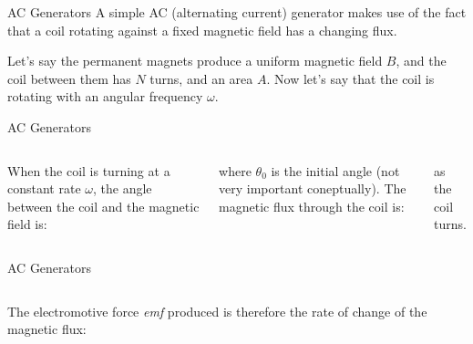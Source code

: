 \documentclass[12pt,aspectratio=169]{beamer}
\begin{document}
\begin{frame}{AC Generators}
  A simple AC (alternating current) generator makes use of the fact that a 
  coil rotating against a fixed magnetic field has a changing flux.
  \begin{center}
  \end{center}
  Let's say the permanent magnets produce a uniform magnetic field $B$, and the
  coil between them has $N$ turns, and an area $A$. Now let's say that the coil
  is rotating with an angular frequency $\omega$.
\end{frame}



\begin{frame}{AC Generators}
  \begin{columns}

    When the coil is turning at a constant rate $\omega$, the angle between the
    coil and the magnetic field is:
    

    \vspace{-.1in}where $\theta_0$ is the initial angle (not very important
    coneptually). The magnetic flux through the coil is:
    
    \vspace{-.4in}{\Large
      \begin{align*}
        \Phi_M&=NBA\cos\theta\\
        &=NBA\cos(\omega t+\theta_0)
      \end{align*}
    }
    
    \vspace{-.3in}as the coil turns.
  \end{columns}
\end{frame}



\begin{frame}{AC Generators}
  \begin{columns}

    The electromotive force \emph{emf} produced is therefore the rate of change
    of the magnetic flux:

  \end{columns}
\end{frame}
\end{document}
